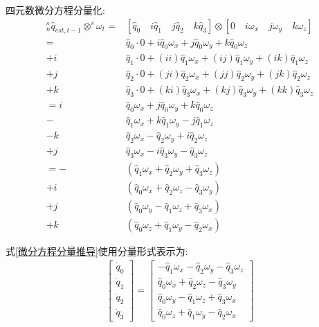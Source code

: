 \documentclass[12pt,a4paper]{article}
\begin{document}
四元数微分方程分量化:
\begin{equation} \label{微分方程分量推导}
    \begin{aligned}
        {^s_n\hat{q}_{est,t-1}}\otimes^s\omega_t
        = &[\hat{q}_0\quad i\hat{q}_1\quad j\hat{q}_2\quad k\hat{q}_3] \otimes [0\quad i\omega_{x}\quad j\omega_{y}\quad k\omega_{z}] \\
        = & \hat{q}_0 \cdot 0 + i    \hat{q}_0 \omega_x + j    \hat{q}_0 \omega_y + k    \hat{q}_0 \omega_z \\
      + i & \hat{q}_1 \cdot 0 + (ii) \hat{q}_1 \omega_x + (ij) \hat{q}_1 \omega_y + (ik) \hat{q}_1 \omega_z \\
      + j & \hat{q}_2 \cdot 0 + (ji) \hat{q}_2 \omega_x + (jj) \hat{q}_2 \omega_y + (jk) \hat{q}_2 \omega_z \\
      + k & \hat{q}_3 \cdot 0 + (ki) \hat{q}_3 \omega_x + (kj) \hat{q}_3 \omega_y + (kk) \hat{q}_3 \omega_z \\
    =   i & \hat{q}_0 \omega_x + j \hat{q}_0 \omega_y + k \hat{q}_0 \omega_z \\
        - & \hat{q}_1 \omega_x + k \hat{q}_1 \omega_y - j \hat{q}_1 \omega_z \\
      - k & \hat{q}_2 \omega_x -   \hat{q}_2 \omega_y + i \hat{q}_2 \omega_z \\
        + j & \hat{q}_3 \omega_x - i \hat{q}_3 \omega_y -   \hat{q}_3 \omega_z \\
        = - & (\hat{q}_1 \omega_x + \hat{q}_2 \omega_y + \hat{q}_3 \omega_z) \\
        + i &(\hat{q}_0 \omega_x + \hat{q}_2 \omega_z - \hat{q}_3 \omega_y) \\
        + j & (\hat{q}_0 \omega_y - \hat{q}_1 \omega_z + \hat{q}_3 \omega_x) \\
        + k & (\hat{q}_0 \omega_z + \hat{q}_1 \omega_y - \hat{q}_2 \omega_x)
    \end{aligned}
\end{equation}

式\ref{微分方程分量推导}使用分量形式表示为:
\begin{equation} \label{微分方程分量化}
    \begin{aligned}
        \left[\begin{array}{c}
                \dot{q}_{0} \\
                \dot{q}_{1} \\
                \dot{q}_{2} \\
                \dot{q}_{3}
        \end{array}\right]
        =\left[\begin{array}{c}
        - \hat{q}_1 \omega_x - \hat{q}_2 \omega_y - \hat{q}_3 \omega_z \\
          \hat{q}_0 \omega_x + \hat{q}_2 \omega_z - \hat{q}_3 \omega_y \\
          \hat{q}_0 \omega_y - \hat{q}_1 \omega_z + \hat{q}_3 \omega_x \\
          \hat{q}_0 \omega_z + \hat{q}_1 \omega_y - \hat{q}_2 \omega_x
        \end{array}\right]
    \end{aligned}
\end{equation}
\end{document}

